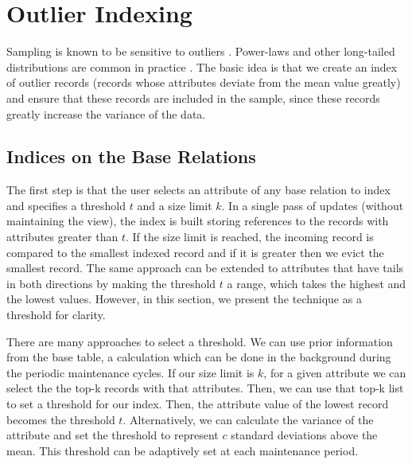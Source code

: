 \vspace{-.5em}
\section{Outlier Indexing}\label{outlier}
Sampling is known to be sensitive to outliers \cite{clauset2009power, chaudhuri2001overcoming}.
Power-laws and other long-tailed distributions are common in practice \cite{clauset2009power}.
The basic idea is that we create an index of outlier records (records whose attributes deviate from the mean value greatly) and ensure that these records are included in the sample, since these records greatly increase the variance of the data. 

\subsection{Indices on the Base Relations}
The first step is that the user selects an attribute of any base relation to index and specifies a threshold $t$ and a size limit $k$.
In a single pass of updates (without maintaining the view), the index is built storing references to the records with attributes greater than $t$.
If the size limit is reached, the incoming record is compared to the smallest indexed record and if it is greater then we evict the smallest record.
The same approach can be extended to attributes that have tails in both directions by making the threshold $t$ a range, which takes the highest and the lowest values.
However, in this section, we present the technique as a threshold for clarity.

There are many approaches to select a threshold.
We can use prior information from the base table, a calculation which can be done in the background during the periodic maintenance cycles.
If our size limit is $k$, for a given attribute we can select the the top-k records with that attributes.
Then, we can use that top-k list to set a threshold for our index. 
Then, the attribute value of the lowest record becomes the threshold $t$.
Alternatively, we can calculate the variance of the attribute and set the threshold to represent $c$ standard deviations above the mean.
This threshold can be adaptively set at each maintenance period.

